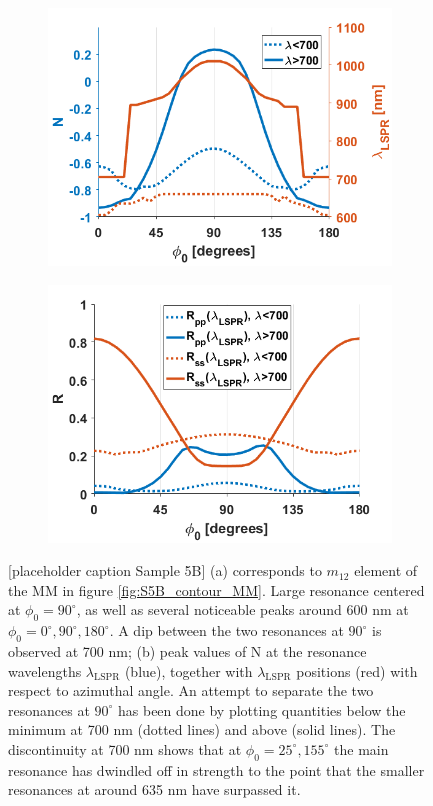 \begin{figure}[h]
    \begin{subfigure}{0.49\textwidth}
        \centering
        \includegraphics[width=0.8\linewidth]{figures/ch4/S5B/LSPR/N@LSPR(2).png}
        \caption{}
        \label{}
    \end{subfigure}
    \begin{subfigure}{0.49\textwidth}
        \centering
        \includegraphics[width=0.8\linewidth]{figures/ch4/S5B/LSPR/RppRss@LSPR.png}
        \caption{}
        \label{}
    \end{subfigure}
    \caption{[placeholder caption Sample 5B] (a) corresponds to $m_{12}$ element of the MM in figure \ref{fig:S5B_contour_MM}. Large resonance centered at $\phi_0=90^\circ$, as well as several noticeable peaks around 600 nm at $\phi_0=0^\circ,90^\circ,180^\circ$. A dip between the two resonances at $90^\circ$ is observed at 700 nm; (b) peak values of N at the resonance wavelengths $\lambda_{\text{LSPR}}$ (blue), together with $\lambda_{\text{LSPR}}$ positions (red) with respect to azimuthal angle. An attempt to separate the two resonances at $90^\circ$ has been done by plotting quantities below the minimum at 700 nm (dotted lines) and above (solid lines). The discontinuity at 700 nm shows that at $\phi_0=25^\circ,155^\circ$ the main resonance has dwindled off in strength to the point that the smaller resonances at around 635 nm have surpassed it.}
    \label{fig:S5B_N@LSPR}
\end{figure}

